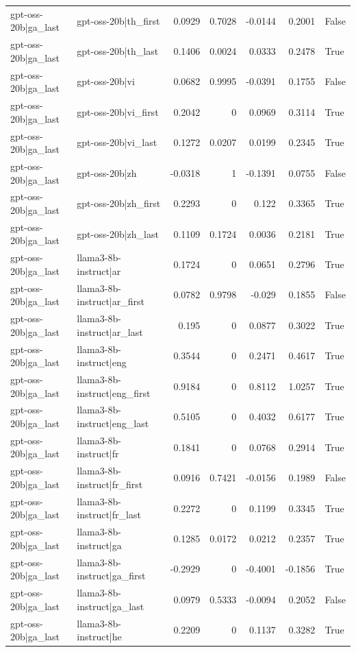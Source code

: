 \begin{table}
\begin{tabular}{l l r r r r l}
gpt-oss-20b|ga_last & gpt-oss-20b|th_first & 0.0929 & 0.7028 & -0.0144 & 0.2001 & False \\
gpt-oss-20b|ga_last & gpt-oss-20b|th_last & 0.1406 & 0.0024 & 0.0333 & 0.2478 & True \\
gpt-oss-20b|ga_last & gpt-oss-20b|vi & 0.0682 & 0.9995 & -0.0391 & 0.1755 & False \\
gpt-oss-20b|ga_last & gpt-oss-20b|vi_first & 0.2042 & 0 & 0.0969 & 0.3114 & True \\
gpt-oss-20b|ga_last & gpt-oss-20b|vi_last & 0.1272 & 0.0207 & 0.0199 & 0.2345 & True \\
gpt-oss-20b|ga_last & gpt-oss-20b|zh & -0.0318 & 1 & -0.1391 & 0.0755 & False \\
gpt-oss-20b|ga_last & gpt-oss-20b|zh_first & 0.2293 & 0 & 0.122 & 0.3365 & True \\
gpt-oss-20b|ga_last & gpt-oss-20b|zh_last & 0.1109 & 0.1724 & 0.0036 & 0.2181 & True \\
gpt-oss-20b|ga_last & llama3-8b-instruct|ar & 0.1724 & 0 & 0.0651 & 0.2796 & True \\
gpt-oss-20b|ga_last & llama3-8b-instruct|ar_first & 0.0782 & 0.9798 & -0.029 & 0.1855 & False \\
gpt-oss-20b|ga_last & llama3-8b-instruct|ar_last & 0.195 & 0 & 0.0877 & 0.3022 & True \\
gpt-oss-20b|ga_last & llama3-8b-instruct|eng & 0.3544 & 0 & 0.2471 & 0.4617 & True \\
gpt-oss-20b|ga_last & llama3-8b-instruct|eng_first & 0.9184 & 0 & 0.8112 & 1.0257 & True \\
gpt-oss-20b|ga_last & llama3-8b-instruct|eng_last & 0.5105 & 0 & 0.4032 & 0.6177 & True \\
gpt-oss-20b|ga_last & llama3-8b-instruct|fr & 0.1841 & 0 & 0.0768 & 0.2914 & True \\
gpt-oss-20b|ga_last & llama3-8b-instruct|fr_first & 0.0916 & 0.7421 & -0.0156 & 0.1989 & False \\
gpt-oss-20b|ga_last & llama3-8b-instruct|fr_last & 0.2272 & 0 & 0.1199 & 0.3345 & True \\
gpt-oss-20b|ga_last & llama3-8b-instruct|ga & 0.1285 & 0.0172 & 0.0212 & 0.2357 & True \\
gpt-oss-20b|ga_last & llama3-8b-instruct|ga_first & -0.2929 & 0 & -0.4001 & -0.1856 & True \\
gpt-oss-20b|ga_last & llama3-8b-instruct|ga_last & 0.0979 & 0.5333 & -0.0094 & 0.2052 & False \\
gpt-oss-20b|ga_last & llama3-8b-instruct|he & 0.2209 & 0 & 0.1137 & 0.3282 & True \\

\end{tabular}
\end{table}
